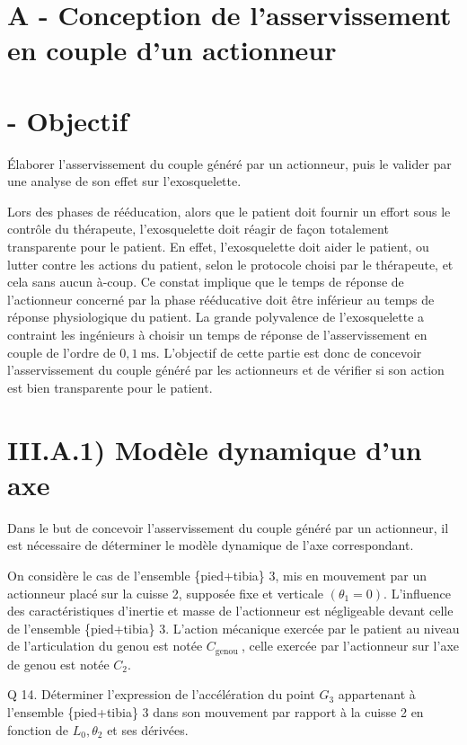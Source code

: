\documentclass[10pt]{article}
\begin{document}
\section{A - Conception de l'asservissement en couple d'un actionneur}
\section{- Objectif}
Élaborer l'asservissement du couple généré par un actionneur, puis le valider par une analyse de son effet sur l'exosquelette.

Lors des phases de rééducation, alors que le patient doit fournir un effort sous le contrôle du thérapeute, l'exosquelette doit réagir de façon totalement transparente pour le patient. En effet, l'exosquelette doit aider le patient, ou lutter contre les actions du patient, selon le protocole choisi par le thérapeute, et cela sans aucun à-coup. Ce constat implique que le temps de réponse de l'actionneur concerné par la phase rééducative doit être inférieur au temps de réponse physiologique du patient. La grande polyvalence de l'exosquelette a contraint les ingénieurs à choisir un temps de réponse de l'asservissement en couple de l'ordre de $0,1 \mathrm{~ms}$. L'objectif de cette partie est donc de concevoir l'asservissement du couple généré par les actionneurs et de vérifier si son action est bien transparente pour le patient.

\section{III.A.1) Modèle dynamique d'un axe}
Dans le but de concevoir l'asservissement du couple généré par un actionneur, il est nécessaire de déterminer le modèle dynamique de l'axe correspondant.

On considère le cas de l'ensemble \{pied+tibia\} 3, mis en mouvement par un actionneur placé sur la cuisse 2, supposée fixe et verticale $\left(\theta_{1}=0\right)$. L'influence des caractéristiques d'inertie et masse de l'actionneur est négligeable devant celle de l'ensemble \{pied+tibia\} 3. L'action mécanique exercée par le patient au niveau de l'articulation du genou est notée $C_{\text {genou }}$, celle exercée par l'actionneur sur l'axe de genou est notée $C_{2}$.

Q 14. Déterminer l'expression de l'accélération du point $G_{3}$ appartenant à l'ensemble \{pied+tibia\} 3 dans son mouvement par rapport à la cuisse 2 en fonction de $L_{0}, \theta_{2}$ et ses dérivées.
\end{document}
